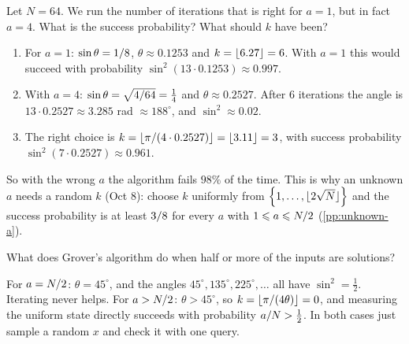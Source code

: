\begin{exercisebox}
\begin{pproblem}\label{pp:wrong-a}
    Let $N = 64$. We run the number of iterations that is right for $a = 1$, but in fact $a = 4$.
    What is the success probability? What should $k$ have been?
\end{pproblem}
\tcblower
\begin{wsolution}
    \leavevmode
    \begin{enumerate}
        \item For $a = 1$: $\sin\theta = 1/8$, $\theta \approx 0.1253$ and
              $k = \floor{6.27} = 6$. With $a = 1$ this would succeed with probability
              $\sin^2(13 \cdot 0.1253) \approx 0.997$.
        \item With $a = 4$: $\sin\theta = \sqrt{4/64} = \frac{1}{4}$ and
              $\theta \approx 0.2527$. After $6$ iterations the angle is
              $13 \cdot 0.2527 \approx 3.285$ rad $\approx 188^\circ$, and $\sin^2 \approx 0.02$.
        \item The right choice is $k = \floor{\sfrac{\pi}{(4 \cdot 0.2527)}} = \floor{3.11} = 3$, with
              success probability $\sin^2(7 \cdot 0.2527) \approx 0.961$.
    \end{enumerate}
    So with the wrong $a$ the algorithm fails $98\%$ of the time. This is why an unknown $a$ needs a
    random $k$ (Oct 8): choose $k$ uniformly from $\set{1, \dots, \floor{2\sqrt{N}}}$ and the success
    probability is at least $3/8$ for every $a$ with $1 \leqslant a \leqslant N/2$
    (\cref{pp:unknown-a}).
\end{wsolution}
\end{exercisebox}

\begin{exercisebox}
\begin{pproblem}[$a = N/2$ and $a > N/2$]\label{pp:half}
    What does Grover's algorithm do when half or more of the inputs are solutions?
\end{pproblem}
\tcblower
\begin{wsolution}
    For $a = N/2$: $\theta = 45^\circ$, and the angles $45^\circ, 135^\circ, 225^\circ, \dots$
    all have $\sin^2 = \frac{1}{2}$. Iterating never helps. For $a > N/2$:
    $\theta > 45^\circ$, so $k = \floor{\sfrac{\pi}{(4\theta)}} = 0$, and measuring the uniform state
    directly succeeds with probability $a/N > \frac{1}{2}$. In both cases just sample a
    random $x$ and check it with one query.
\end{wsolution}
\end{exercisebox}

